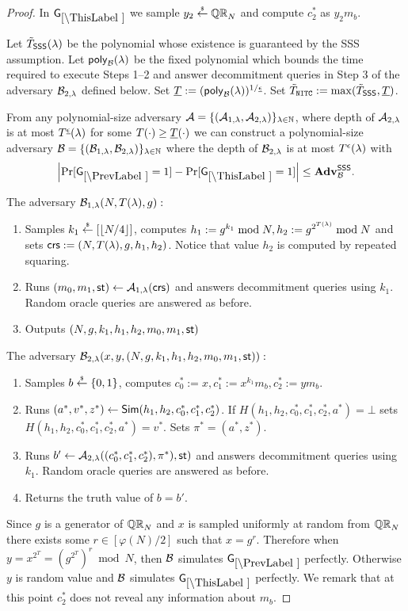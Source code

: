 \begin{proof}
In $\games_\thisgame$ we sample $y_2 \stackrel{{\scriptscriptstyle\$}}{\leftarrow} \mathbb{QR}_N$ and compute $c_2^*$ as $y_2 m_b$.

Let $\tilde{T}_\mathsf{SSS}(\lambda)$ be the polynomial whose existence is guaranteed by the SSS assumption.
Let $\mathsf{poly}_{\mathcal{B}}(\lambda)$ be the fixed polynomial which bounds the time required to execute Steps 1--2 and answer decommitment queries in Step 3 of the adversary $\mathcal{B}_{2, \lambda}$ defined below. Set $\underline{T} := (\mathsf{poly}_{\mathcal{B}}(\lambda))^{1 / \underline{\epsilon}}$.  Set $\tilde{T}_{\mathtt{NITC}} := \max(\tilde{T}_\mathsf{SSS}, \underline{T})$.
\begin{lemma}
From any polynomial-size adversary $\mathcal{A} = \{(\mathcal{A}_{1,\lambda}, \mathcal{A}_{2, \lambda})\}_{\lambda \in \mathbb{N}}$, where depth of $\mathcal{A}_{2, \lambda}$ is at most $T^{\underline{\epsilon}}(\lambda)$ for some $T(\cdot) \geq \underline{T}(\cdot)$ we can construct a polynomial-size adversary $\mathcal{B} = \{(\mathcal{B}_{1,\lambda}, \mathcal{B}_{2, \lambda})\}_{\lambda \in \mathbb{N}}$ where the depth of $\mathcal{B}_{2, \lambda}$ is at most $T^{\epsilon}(\lambda)$ with
\[
\left|\Pr[\games_\prevgame = 1] - \Pr[\games_\thisgame = 1]\right| \leq \advtg_\advB^\sss.
\]
\end{lemma}

The adversary $\mathcal{B}_{1,\lambda}(N, T(\lambda), g):$
\vspace{-2mm}
\begin{enumerate}
\item Samples $k_1 \stackrel{{\scriptscriptstyle\$}}{\leftarrow} [\left\lfloor N/4 \right\rfloor]$, computes $h_1 := g^{k_1} \bmod N, h_2 := g^{2^{T(\lambda)}} \bmod N$ and sets $\mathsf{crs}:=(N, T(\lambda), g, h_1, h_2)$. Notice that value $h_2$ is computed by repeated squaring.
\item Runs $(m_0, m_1, \mathsf{st}) \leftarrow \mathcal{A}_{1, \lambda}(\mathsf{crs})$ and answers decommitment queries using $k_1$. Random oracle queries are answered as before. 
\item Outputs $(N,g,k_1, h_1,h_2, m_0, m_1, \mathsf{st})$
\end{enumerate}

The adversary $\mathcal{B}_{2,\lambda}(x,y,(N,g,k_1, h_1,h_2, m_0, m_1, \mathsf{st})):$
\vspace{-2mm}
\begin{enumerate}
\item Samples $b \stackrel{{\scriptscriptstyle\$}}{\leftarrow} \{0,1\}$, computes $c_0^*:=x, c_1^*:=x^{k_1} m_b, c_2^*:=y m_b$.
\item Runs $(a^*,v^*,z^*) \leftarrow \mathsf{Sim}(h_1, h_2, c_0^*, c_1^*, c_2^*)$. If $H(h_1, h_2, c_0^*, c_1^*, c_2^*,a^*) = \bot$ sets $H(h_1, h_2, c_0^*, c_1^*, c_2^*,a^*) = v^*$. Sets $\pi^* = (a^*,z^*)$.
\item Runs $b' \leftarrow \mathcal{A}_{2, \lambda}((c_0^*, c_1^*, c_2^*), \pi^*), \mathsf{st})$ and answers decommitment queries using $k_1$. Random oracle queries are answered as before. 
\item Returns the truth value of $b=b'$.
\end{enumerate}
Since $g$ is a generator of $\mathbb{QR}_N$ and $x$ is sampled uniformly at random from $\mathbb{QR}_N$ there exists some $r \in [\varphi(N)/2]$ such that $x = g^{r}$. Therefore when $y = x^{2^T} = (g^{2^T})^{r} \bmod N$, then $\mathcal{B}$ simulates $\games_\prevgame$ perfectly. Otherwise $y$ is random value and $\mathcal{B}$ simulates $\games_\thisgame$ perfectly. We remark that at this point $c_2^*$ does not reveal any information about $m_b$.


\end{proof}
